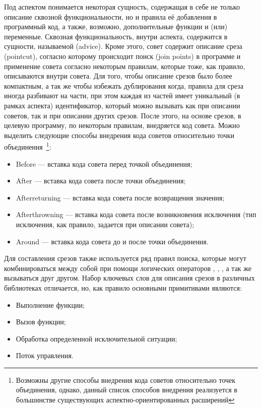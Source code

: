Под аспектом понимается некоторая сущность, содержащая в себе не только описание
сквозной функциональности, но и правила её добавления в программный код, а
также, возможно, дополнительные функции и (или) переменные.
Сквозная функциональность, внутри аспекта, содержится в сущности, называемой
 (advice).
Кроме этого, совет содержит описание среза (pointcut), согласно которому
происходит поиск  (join points) в программе и применение
совета согласно некоторым правилам, которые тоже, как правило, описываются
внутри совета.
Для того, чтобы описание срезов было более компактным, а так же чтобы избежать
дублирования когда, правила для среза иногда разбивают на части, при этом каждая
из частей имеет уникальный (в рамках аспекта) идентификатор, который можно
вызывать как при описании советов, так и при описании других срезов.
После этого, на основе срезов, в целевую программу, по некоторым правилам,
внедряется код совета.
Можно выделить следующие способы внедрения кода советов относительно точки
объединения~\footnote{Возможны другие способы внедрения кода советов
относительно точек объединения, однако, данный список способов внедрения
реализуется в большинстве существующих аспектно-ориентированных расширений}:
\begin{itemize}
  \item Before --- вставка кода совета перед точкой объединения;
  \item After --- вставка кода совета после точки объединения;
  \item Afterreturning --- вставка кода совета после возвращения значения;
  \item Afterthrowning --- вставка кода совета после возникновения исключения
    (тип исключения, как правило, задается при описании совета);
  \item Around --- вставка кода совета до и после точки объединения.
\end{itemize}

Для составления срезов также используется ряд правил поиска, которые могут
комбинироваться между собой при помощи логических операторов ,
, , а так же вызываться друг другом.
Набор ключевых слов для описания срезов в различных библиотеках отличается, но,
как правило основными примитивами являются:
\begin{itemize}
  \item Выполнение функции;
  \item Вызов функции;
  \item Обработка определенной исключительной ситуации;
  \item Поток управления.
\end{itemize}

